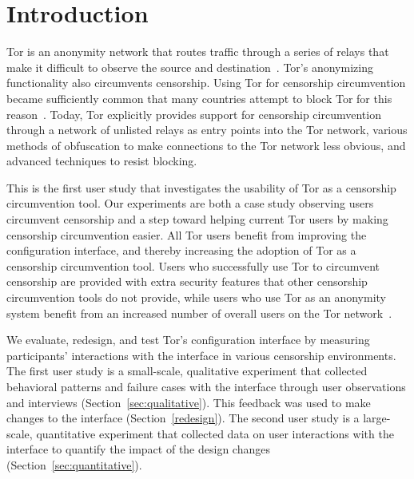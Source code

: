 \documentclass[USenglish,oneside,twocolumn]{article}
\begin{document}


\maketitle

\section{Introduction}


Tor is an anonymity network that routes traffic through a series of relays
that make it difficult to observe the source and destination~\cite{dingledine2004tor}. Tor's anonymizing functionality also circumvents censorship. Using Tor for censorship circumvention became sufficiently common that many countries attempt to block Tor for this reason~\cite{winter2012great}. Today, Tor explicitly provides support for censorship circumvention through a network of unlisted relays as entry points into the Tor network, various methods of obfuscation to make connections to the Tor network less obvious, and advanced techniques to resist blocking.
 
This is the first user study that investigates the usability of Tor as a censorship circumvention tool. Our experiments are both a case study observing users circumvent censorship and a step toward helping current Tor users by making censorship circumvention easier. All Tor users benefit from improving the configuration interface, and thereby increasing the adoption of Tor as a censorship circumvention tool. Users who successfully use Tor to circumvent censorship are provided with extra security features that other censorship circumvention tools do not provide, while users who use Tor as an anonymity system benefit from an increased number of overall users on the Tor network~\cite{dingledine2006anonymity}.

We evaluate, redesign, and test Tor's configuration interface by
measuring participants' interactions with the interface in various censorship environments.
The first user study is a small-scale, qualitative experiment that collected 
behavioral patterns and failure cases with the interface through user observations
and interviews (Section~\ref{sec:qualitative}). This feedback was used to make changes to the interface (Section~\ref{redesign}). The second user study is a large-scale, quantitative experiment
that collected data on user interactions with the interface to quantify the impact of the design changes (Section~\ref{sec:quantitative}).
\end{document}
